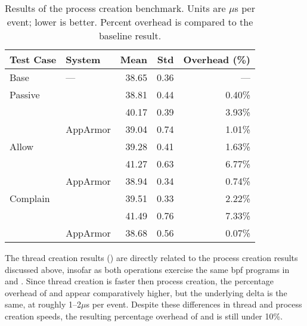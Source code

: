 \begingroup\small
\begin{longtable}[c]{llrrr}
  \caption[Results of the process creation benchmark]{
    Results of the process creation benchmark. Units are $\mu$s per event; lower is
    better. Percent overhead is compared to the baseline result.
  }%
  \label{tab:phoronix-processes}\\
  \toprule
   Test Case & System         &  Mean & Std & Overhead (\%)\\
   \midrule
   Base      & ---            & 38.65 & 0.36 &  ---    \\
   \midrule
   Passive   & \bpfbox{}      & 38.81 & 0.44 &  0.40\% \\
             & \bpfcontain{}  & 40.17 & 0.39 &  3.93\% \\
             & AppArmor       & 39.04 & 0.74 &  1.01\% \\
   \midrule
   Allow     & \bpfbox{}      & 39.28 & 0.41 &  1.63\% \\
             & \bpfcontain{}  & 41.27 & 0.63 &  6.77\% \\
             & AppArmor       & 38.94 & 0.34 &  0.74\% \\
   \midrule
   Complain  & \bpfbox{}      & 39.51 & 0.33 &  2.22\% \\
             & \bpfcontain{}  & 41.49 & 0.76 &  7.33\% \\
             & AppArmor       & 38.68 & 0.56 &  0.07\% \\
  \bottomrule
\end{longtable}
\endgroup

The thread creation results () are directly related to the
process creation results discussed above, insofar as both operations exercise the same
\gls{bpf} programs in \bpfbox{} and \bpfcontain{}. Since thread creation is faster then
process creation, the percentage overhead of \bpfbox{} and \bpfcontain{} appear
comparatively higher, but the underlying delta is the same, at roughly 1--2$\mu$s per
event. Despite these differences in thread and process creation speeds, the resulting
percentage overhead of \bpfbox{} and \bpfcontain{} is still under 10\%.

